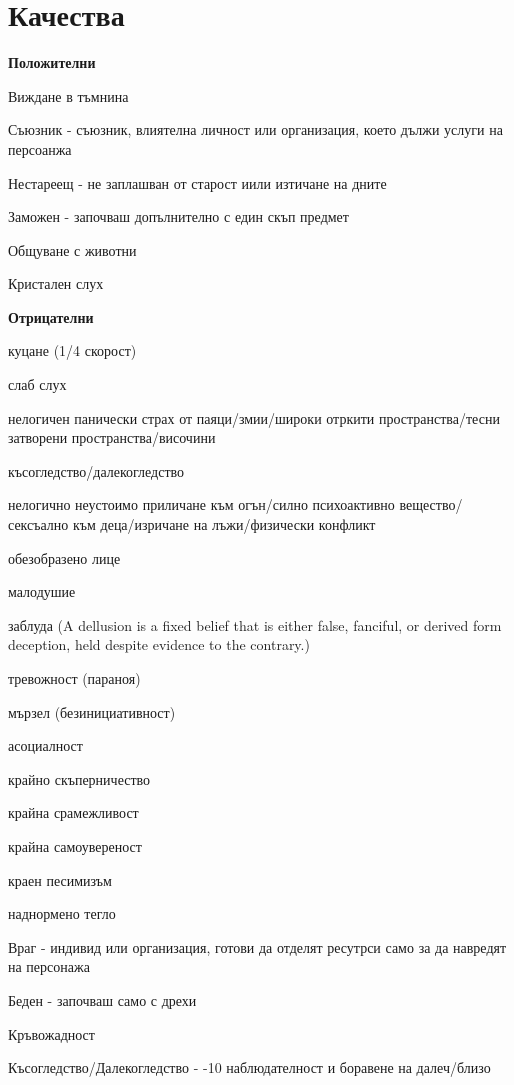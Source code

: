 \section{Качества}

\textbf{Положителни}
\begin{itemize*}
\item{Виждане в тъмнина}
\item{Съюзник - съюзник, влиятелна личност или организация, което дължи услуги на персоанжа}
\item{Нестареещ - не заплашван от старост иили изтичане на дните}
\item{Заможен - започваш допълнително с един скъп предмет}
\item{Общуване с животни}
\item{Кристален слух}
\end{itemize*}

\vspace{0.7cm}
\textbf{Отрицателни}
\begin{itemize*}
\item{куцане (1/4 скорост)}
\item{слаб слух}
\item{нелогичен панически страх от паяци/змии/широки отркити пространства/тесни затворени пространства/височини}
\item{късогледство/далекогледство}
\item{нелогично неустоимо приличане към огън/силно психоактивно вещество/сексъално към деца/изричане на лъжи/физически конфликт}
\item{обезобразено лице}
\item{малодушие}
\item{заблуда (A dellusion is a fixed belief that is either false, fanciful, or derived form deception, held despite evidence to the contrary.)}
\item{тревожност (параноя)}
\item{мързел (безинициативност)}
\item{асоциалност}
\item{крайно скъперничество}
\item{крайна срамежливост}
\item{крайна самоувереност}
\item{краен песимизъм}
\item{наднормено тегло}
\item{Враг - индивид или организация, готови да отделят ресутрси само за да навредят на персонажа}
\item{Беден - започваш само с дрехи}
\item{Кръвожадност}
\item{Късогледство/Далекогледство - -10 наблюдателност и боравене на далеч/близо}
\end{itemize*}

